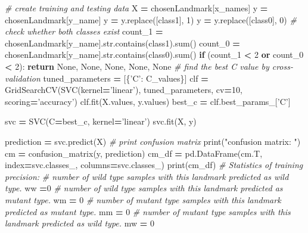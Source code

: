 \documentclass[10pt,letterpaper]{article}
\newenvironment{Shaded}{\begin{snugshade}}{\end{snugshade}}
\newcommand{\KeywordTok}[1]{\textcolor[rgb]{0.13,0.29,0.53}{\textbf{#1}}}
\newcommand{\DecValTok}[1]{\textcolor[rgb]{0.00,0.00,0.81}{#1}}
\newcommand{\StringTok}[1]{\textcolor[rgb]{0.31,0.60,0.02}{#1}}
\newcommand{\CommentTok}[1]{\textcolor[rgb]{0.56,0.35,0.01}{\textit{#1}}}
\newcommand{\VariableTok}[1]{\textcolor[rgb]{0.00,0.00,0.00}{#1}}
\newcommand{\ControlFlowTok}[1]{\textcolor[rgb]{0.13,0.29,0.53}{\textbf{#1}}}
\newcommand{\OperatorTok}[1]{\textcolor[rgb]{0.81,0.36,0.00}{\textbf{#1}}}
\newcommand{\BuiltInTok}[1]{#1}
\newcommand{\NormalTok}[1]{#1}
\begin{document}
\begin{Shaded}
\begin{Highlighting}[]
    \CommentTok{# create training and testing data}
\NormalTok{    X }\OperatorTok{=}\NormalTok{ chosenLandmark[x_names]}
\NormalTok{    y }\OperatorTok{=}\NormalTok{ chosenLandmark[y_name]}
\NormalTok{    y }\OperatorTok{=}\NormalTok{ y.replace([class1], }\DecValTok{1}\NormalTok{)}
\NormalTok{    y }\OperatorTok{=}\NormalTok{ y.replace([class0], }\DecValTok{0}\NormalTok{)}
    \CommentTok{# check whether both classes exist}
\NormalTok{    count_1 }\OperatorTok{=}\NormalTok{ chosenLandmark[y_name].}\BuiltInTok{str}\NormalTok{.contains(class1).}\BuiltInTok{sum}\NormalTok{()}
\NormalTok{    count_0 }\OperatorTok{=}\NormalTok{ chosenLandmark[y_name].}\BuiltInTok{str}\NormalTok{.contains(class0).}\BuiltInTok{sum}\NormalTok{()}
    \ControlFlowTok{if}\NormalTok{ (count_1 }\OperatorTok{<} \DecValTok{2} \KeywordTok{or}\NormalTok{ count_0 }\OperatorTok{<} \DecValTok{2}\NormalTok{):}
        \ControlFlowTok{return} \VariableTok{None}\NormalTok{, }\VariableTok{None}\NormalTok{, }\VariableTok{None}\NormalTok{, }\VariableTok{None}\NormalTok{, }\VariableTok{None}
    \CommentTok{# find the best C value by cross-validation}
\NormalTok{    tuned_parameters }\OperatorTok{=}\NormalTok{ [\{}\StringTok{'C'}\NormalTok{: C_values\}]}
\NormalTok{    clf }\OperatorTok{=}\NormalTok{ GridSearchCV(SVC(kernel}\OperatorTok{=}\StringTok{'linear'}\NormalTok{), tuned_parameters, cv}\OperatorTok{=}\DecValTok{10}\NormalTok{, scoring}\OperatorTok{=}\StringTok{'accuracy'}\NormalTok{)}
\NormalTok{    clf.fit(X.values, y.values)}
\NormalTok{    best_c }\OperatorTok{=}\NormalTok{ clf.best_params_[}\StringTok{'C'}\NormalTok{]}
    
\NormalTok{    svc }\OperatorTok{=}\NormalTok{ SVC(C}\OperatorTok{=}\NormalTok{best_c, kernel}\OperatorTok{=}\StringTok{'linear'}\NormalTok{)}
\NormalTok{    svc.fit(X, y)}
    
\NormalTok{    prediction }\OperatorTok{=}\NormalTok{ svc.predict(X)}
    \CommentTok{# print confusion matrix}
    \BuiltInTok{print}\NormalTok{(}\StringTok{"confusion matrix: "}\NormalTok{)}
\NormalTok{    cm }\OperatorTok{=}\NormalTok{ confusion_matrix(y, prediction)}
\NormalTok{    cm_df }\OperatorTok{=}\NormalTok{ pd.DataFrame(cm.T, index}\OperatorTok{=}\NormalTok{svc.classes_, columns}\OperatorTok{=}\NormalTok{svc.classes_)}
    \BuiltInTok{print}\NormalTok{(cm_df)}
    \CommentTok{# Statistics of training precision:}
    \CommentTok{# number of wild type samples with this landmark predicted as wild type.}
\NormalTok{    ww }\OperatorTok{=}\DecValTok{0}
    \CommentTok{# number of wild type samples with this landmark predicted as mutant type.}
\NormalTok{    wm }\OperatorTok{=} \DecValTok{0}
    \CommentTok{# number of mutant type samples with this landmark predicted as mutant type.}
\NormalTok{    mm }\OperatorTok{=} \DecValTok{0}
    \CommentTok{# number of mutant type samples with this landmark predicted as wild type.}
\NormalTok{    mw }\OperatorTok{=} \DecValTok{0}
    

\end{Highlighting}
\end{Shaded}
\end{document}
